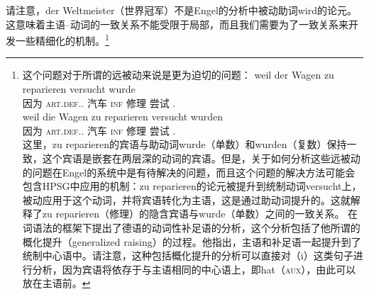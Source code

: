 请注意，der Weltmeister（世界冠军）不是Engel的分析中被动助词wird的论元。这意味着主语--动词的一致关系不能受限于局部，而且我们需要为了一致关系来开发一些精细化的机制。\footnote{%
这个问题对于所谓的远被动来说是更为迫切的问题：
\eal
\ex
\gll weil der Wagen zu reparieren versucht wurde\\
     因为 \textsc{art}.\textsc{def}.\sg.\nom{} 汽车 \textsc{inf} 修理 尝试 \passivepst.\sg\\
\ex
\gll weil die Wagen zu reparieren versucht wurden\\
     因为 \textsc{art}.\textsc{def}.\pl.\nom{} 汽车 \textsc{inf} 修理 尝试 \passivepst.\pl\\
\zl
这里，zu reparieren的宾语与助动词wurde（单数）和wurden（复数）保持一致，这个宾语是嵌套在两层深的动词的宾语。但是，关于如何分析这些远被动的问题在Engel的系统中是有待解决的问题，而且这个问题的解决方法可能会包含HPSG中应用的机制：zu reparieren的论元被提升到统制动词versucht上，被动应用于这个动词，并将宾语转化为主语，这是通过助动词提升的。这就解释了zu reparieren（修理）的隐含宾语与wurde（单数）之间的一致关系。 \citet{Hudson97a}在词语法的框架下提出了德语的动词性补足语的分析，这个分析包括了他所谓的概化提升（generalized raising）的过程。他指出，主语和补足语一起提升到了统制中心语中。请注意，这种包括概化提升的分析可以直接对（i）这类句子进行分析，因为宾语将依存于与主语相同的中心语上，即hat（\textsc{aux}），由此可以放在主语前。
}
